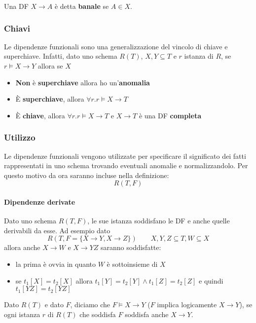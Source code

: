 \begin{definition}
	Una DF $X \to A$ è detta \textbf{banale} se $A \in X$.
\end{definition} 

\subsubsection{Chiavi}
Le dipendenze funzionali sono una generalizzazione del vincolo di chiave e superchiave. Infatti, dato uno schema $R(T)$, $X,Y \subseteq T$ e $r$ istanza di $R$, se $r \models X \to Y$ allora se $X$
\begin{itemize}
	\item \textbf{Non} è \textbf{superchiave} allora ho un'\textbf{anomalia}
	\item È \textbf{superchiave}, allora $\forall r . r\models X \to T$
	\item È \textbf{chiave}, allora $\forall r. r\models X \to T$ e $X \to T$ è una DF \textbf{completa}
\end{itemize}

\subsubsection{Utilizzo}
Le dipendenze funzionali vengono utilizzate per specificare il significato dei fatti rappresentati in uno schema trovando eventuali anomalie e normalizzandolo. Per questo motivo da ora saranno incluse nella definizione:
\begin{equation}
	R(T,F)
\end{equation}

\paragraph{Dipendenze derivate}
Dato uno schema $R(T,F)$, le sue istanza soddisfano le DF e anche quelle derivabili da esse. Ad esempio dato
\[
R(T,F=\{X \to Y, X \to Z\}) \qquad X,Y,Z \subseteq T, W \subseteq X
\]
allora anche $X \to W$ e $X \to YZ$ saranno soddisfatte:
\begin{itemize}
	\item la prima è ovvia in quanto $W$ è sottoinsieme di $X$
	\item se $t_1[X] = t_2[X]$  allora $t_1[Y] = t_2[Y] \land t_1[Z] = t_2[Z]$ e quindi $t_1[YZ] = t_2[YZ]$
\end{itemize}
\begin{definition}
	Dato $R(T)$ e dato $F$, diciamo che $F \models X \to Y$ ($F$ implica logicamente $X \to	Y$), se ogni istanza $r$ di $R(T)$ che soddisfa $F$ soddisfa anche $X \to Y$.
\end{definition}

